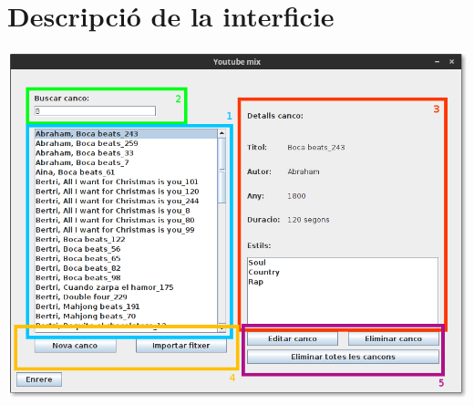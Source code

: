 \documentclass[letterpaper,10pt,oneside]{sphinxmanual}
\begin{document}
\section{Descripció de la interficie}
\label{gest_cancons:descripcio-de-la-interficie}
\includegraphics{gest_canco.png}
\end{document}
